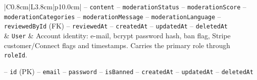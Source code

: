 \begin{center}
\begin{longtable}{|C{0.8cm}|L{3.8cm}|p{10.0cm}|}
\hspace*{1em}-- \texttt{content} \newline
\hspace*{1em}-- \texttt{moderation\allowbreak Status} \newline
\hspace*{1em}-- \texttt{moderation\allowbreak Score} \newline
\hspace*{1em}-- \texttt{moderation\allowbreak Categories} \newline
\hspace*{1em}-- \texttt{moderation\allowbreak Message} \newline
\hspace*{1em}-- \texttt{moderation\allowbreak Language} \newline
\hspace*{1em}-- \texttt{reviewed\allowbreak By\allowbreak Id} (FK) \newline
\hspace*{1em}-- \texttt{reviewed\allowbreak At} \newline
\hspace*{1em}-- \texttt{created\allowbreak At} \newline
\hspace*{1em}-- \texttt{updated\allowbreak At} \newline
\hspace*{1em}-- \texttt{deleted\allowbreak At} \\
 & \texttt{User} & Account identity: e-mail, bcrypt password hash, ban flag, Stripe customer/Connect flags and timestamps. Carries the primary role through \texttt{roleId}.\par\smallskip
\hspace*{1em}-- \texttt{id} (PK) \newline
\hspace*{1em}-- \texttt{email} \newline
\hspace*{1em}-- \texttt{password} \newline
\hspace*{1em}-- \texttt{is\allowbreak Banned} \newline
\hspace*{1em}-- \texttt{created\allowbreak At} \newline
\hspace*{1em}-- \texttt{updated\allowbreak At} \newline
\hspace*{1em}-- \texttt{deleted\allowbreak At} \newline

\end{longtable}
\end{center}
